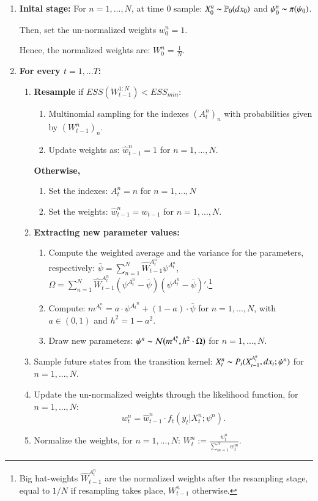 \documentclass[
]{book}
\theoremstyle{break}
\theoremstyle{nonumberplain}
\begin{document}
\begin{enumerate}
    \item \textbf{Inital stage: }For $n=1,...,N$, at time 0 sample: $X_0^n\thicksim\mathbb P_0(dx_0)$ and $\psi_0^n\thicksim \pi(\psi_0)$.
    
    Then, set the un-normalized weights $w_0^n=1$.
    
    Hence, the normalized weights are: $W_0^n=\frac{1}{N}$.
    \item \textbf{For every $t=1,...T$:}
    \begin{enumerate}
        \item \textbf{Resample} if $ESS(W_{t-1}^{1:N})<ESS_{min}$:
\begin{enumerate}
    \item Multinomial sampling for the indexes $(A_t^n)_n$ with probabilities given by $(W_{t-1}^n)_{n}$.
    \item Update weights as: $\hat w_{t-1}^n = 1$ for $n=1,...,N$.
\end{enumerate}
\textbf{Otherwise, } 
\begin{enumerate}
    \item Set the indexes: $A_t^{n}=n$ for  $n=1,...,N$
    \item Set the weights: $\hat w_{t-1}^n = w_{t-1}$ for $n=1,...,N$.
\end{enumerate}
\item \textbf{Extracting new parameter values:}
\begin{enumerate}
    \item Compute the weighted average and the variance for the parameters, respectively: $\bar \psi = \sum_{n=1}^N \hat W_{t-1}^{A_t^n}\psi^{A_t^n}$, $\Omega = \sum_{n=1}^N \hat W_{t-1}^{A_t^n}(\psi^{A_t^n}-\bar \psi)(\psi^{A_t^n}-\bar \psi)'$.\footnote{Big hat-weights $ \hat W_{t-1}^{A_t^{n}}$ are the normalized weights after the resampling stage, equal to $1/N$ if resampling takes place, $W_{t-1}^n$ otherwise.}
    \item Compute: $m^{A_t^{n}}=a \cdot  \psi^{{A_t}^{n}}+(1-a)\cdot \bar \psi$ for $n=1,...,N$, with $a\in (0,1)$ and $h^2=1-a^2$.
    \item Draw new parameters: $\psi^n\thicksim \mathcal N\big(m^{A_t^n},h^2\cdot \Omega\big)$ for $n=1,...,N$.
\end{enumerate}
\item Sample future states from the transition kernel: $X_t^n\thicksim P_t(X_{t-1}^{A_t^n},dx_t; \psi^n)$ for $n=1,...,N$.
\item Update the un-normalized weights through the likelihood function, for $n=1,...,N$:
\begin{equation*}
    w_t^n=\hat w_{t-1}^n\cdot f_t(y_t|X_t^n;\psi^n).
\end{equation*}
\item Normalize the weights, for $n=1,...,N$:  $W_t^n:=\frac{w_t^n}{\sum_{m=1}^Nw_t^m}$.
    \end{enumerate}
\end{enumerate}
\end{document}
